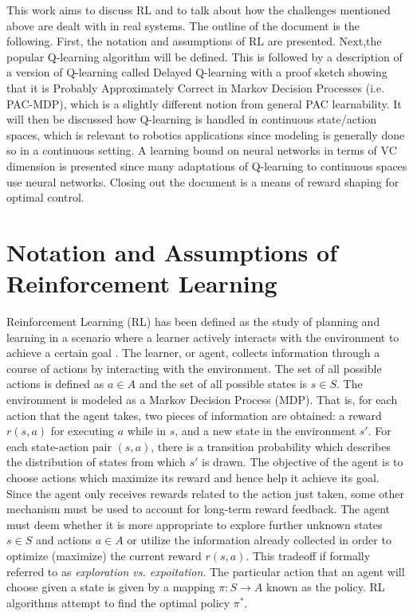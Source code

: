 \documentclass{article} %
\begin{document}
This work aims to discuss RL and to talk about how the challenges mentioned above are dealt with in real systems. The outline of the document is the following. First, the notation and assumptions of RL are presented. Next,the popular Q-learning algorithm will be defined.  This is followed by a description of a version of Q-learning called Delayed Q-learning with a proof sketch showing that it is Probably Approximately Correct in Markov Decision Processes (i.e. PAC-MDP), which is a slightly different notion from general PAC learnability. It will then be discussed how Q-learning is handled in continuous state/action spaces, which is relevant to robotics applications since modeling is generally done so in a continuous setting. A learning bound on neural networks in terms of VC dimension is presented since many adaptations of Q-learning to continuous spaces use neural networks. Closing out the document is a means of reward shaping for optimal control.


\section{Notation and Assumptions of Reinforcement Learning}

Reinforcement Learning (RL) has been defined as the study of planning and learning in a scenario where a learner actively interacts with the environment to achieve a certain goal \cite{mohri}. The learner, or agent, collects information through a course of actions by interacting with the environment.  The set of all possible actions is defined as $a \in A$ and the set of all possible states is $s \in S$. The environment is modeled as a Markov Decision Process (MDP).  That is, for each action that the agent takes, two pieces of information are obtained: a reward $r(s,a)$ for executing $a$ while in $s$, and a new state in the environment $s'$.  For each state-action pair $(s,a)$, there is a transition probability which describes the distribution of states from which $s'$ is drawn.  The objective of the agent is to choose actions which maximize its reward and hence help it achieve its goal.  Since the agent only receives rewards related to the action just taken, some other mechanism must be used to account for long-term reward feedback.
The agent must deem whether it is more appropriate to explore further unknown states $s \in S$ and actions $a \in A$ or utilize the information already collected in order to optimize (maximize) the current reward $r(s,a)$. This tradeoff if formally referred to as \textit{exploration vs. expoitation}. The particular action that an agent will choose given a state is given by a mapping $\pi : S \rightarrow A$ known as the policy. RL algorithms attempt to find the optimal policy $\pi^*$.
\end{document}
